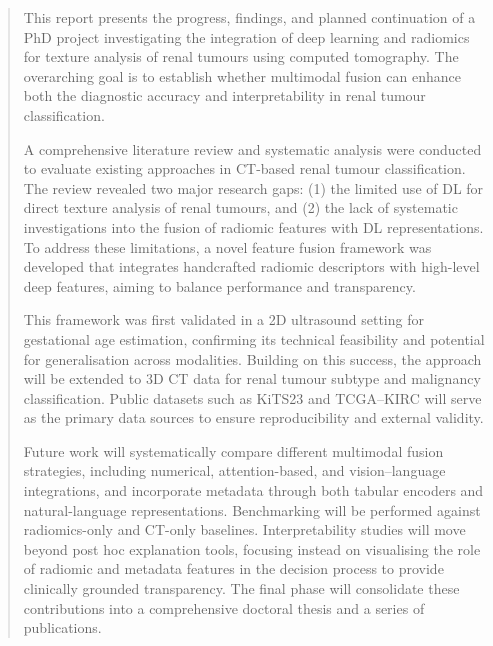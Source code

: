\documentclass[final,british,a4paper,12pt]{phdthesis}
\begin{document}
\begin{abstract}
This report presents the progress, findings, and planned continuation of a PhD project investigating the integration of deep learning and radiomics for texture analysis of renal tumours using computed tomography. The overarching goal is to establish whether multimodal fusion can enhance both the diagnostic accuracy and interpretability in renal tumour classification.

A comprehensive literature review and systematic analysis were conducted to evaluate existing approaches in CT-based renal tumour classification. The review revealed two major research gaps: (1) the limited use of DL for direct texture analysis of renal tumours, and (2) the lack of systematic investigations into the fusion of radiomic features with DL representations. To address these limitations, a novel feature fusion framework was developed that integrates handcrafted radiomic descriptors with high-level deep features, aiming to balance performance and transparency.

This framework was first validated in a 2D ultrasound setting for gestational age estimation, confirming its technical feasibility and potential for generalisation across modalities. Building on this success, the approach will be extended to 3D CT data for renal tumour subtype and malignancy classification. Public datasets such as KiTS23 and TCGA–KIRC will serve as the primary data sources to ensure reproducibility and external validity.

Future work will systematically compare different multimodal fusion strategies, including numerical, attention-based, and vision–language integrations, and incorporate metadata through both tabular encoders and natural-language representations. Benchmarking will be performed against radiomics-only and CT-only baselines. Interpretability studies will move beyond post hoc explanation tools, focusing instead on visualising the role of radiomic and metadata features in the decision process to provide clinically grounded transparency. The final phase will consolidate these contributions into a comprehensive doctoral thesis and a series of publications.

\end{abstract}




\end{document}
